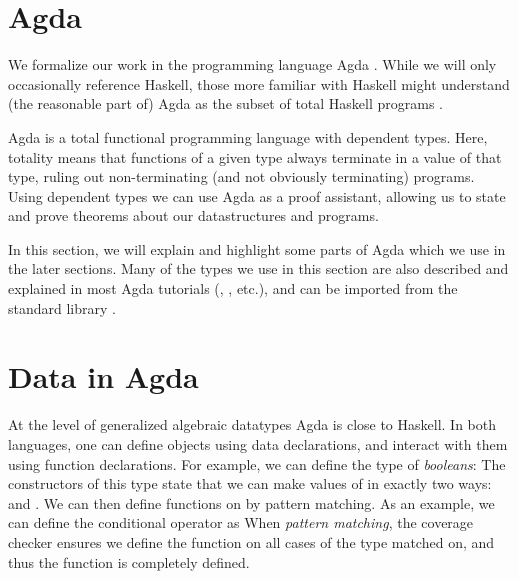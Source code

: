 \section{Agda}\label{sec:background-agda}
We formalize our work in the programming language Agda \cite{agda}. While we will only occasionally reference Haskell, those more familiar with Haskell might understand (the reasonable part of) Agda as the subset of total Haskell programs \cite{agda2hs}.

Agda is a total functional programming language with dependent types. Here, totality means that functions of a given type always terminate in a value of that type, ruling out non-terminating (and not obviously terminating) programs. Using dependent types we can use Agda as a proof assistant, allowing us to state and prove theorems about our datastructures and programs. 

In this section, we will explain and highlight some parts of Agda which we use in the later sections. 
Many of the types we use in this section are also described and explained in most Agda tutorials (\cite{ulftutorial}, \cite{plfa}, etc.), and can be imported from the standard library \cite{agdastdlib}.



\section{Data in Agda}\label{sec:background-data}
At the level of generalized algebraic datatypes Agda is close to Haskell. In both languages, one can define objects using data declarations, and interact with them using function declarations. For example, we can define the type of \emph{booleans}:
The constructors of this type state that we can make values of  in exactly two ways:  and . We can then define functions on  by pattern matching. As an example, we can define the conditional operator as
When \emph{pattern matching}, the coverage checker ensures we define the function on all cases of the type matched on, and thus the function is completely defined. %

